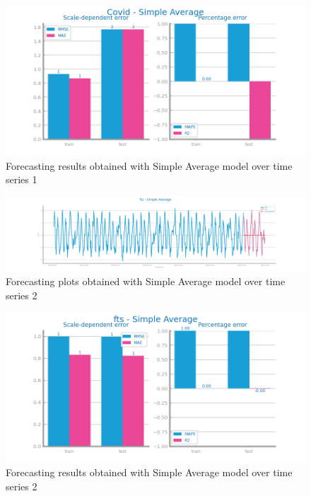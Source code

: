\documentclass[10pt]{extarticle}
\begin{document}
\begin{figure}[H]
\centering\includegraphics[scale=0.5]{images/dataset1/time_series/Covid - Simple Average_forecasting_eval.png}
\caption{Forecasting results obtained with Simple Average model over time series 1}
\end{figure}

\begin{figure}[H]
\centering\includegraphics[scale=0.4]{images/dataset2/time_series/fts_simpleAvg_forecast.png}
\caption{Forecasting plots obtained with Simple Average model over time series 2}
\end{figure}

\begin{figure}[H]
\centering\includegraphics[scale=0.5]{images/dataset2/time_series/fts_simpleAvg_eval.png}
\caption{Forecasting results obtained with Simple Average model over time series 2}
\end{figure}
\end{document}
